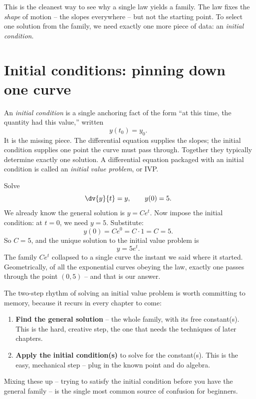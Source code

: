This is the cleanest way to see why a single law yields a family. The law fixes the \emph{shape} of motion -- the slopes everywhere -- but not the starting point. To select one solution from the family, we need exactly one more piece of data: an \emph{initial condition}.

\section{Initial conditions: pinning down one curve}
\label{ch36:sec-ic}

An \emph{initial condition} is a single anchoring fact of the form ``at this time, the quantity had this value,'' written
\[
  y(t_0) = y_0.
\]
It is the missing piece. The differential equation supplies the slopes; the initial condition supplies one point the curve must pass through. Together they typically determine exactly one solution. A differential equation packaged with an initial condition is called an \emph{initial value problem}, or IVP.

\begin{example}
\label{ch36:ex-ivp}
Solve
\[
  \dv{y}{t} = y, \qquad y(0) = 5.
\]
We already know the general solution is $y = Ce^t$. Now impose the initial condition: at $t=0$, we need $y = 5$. Substitute:
\[
  y(0) = Ce^{0} = C\cdot 1 = C = 5.
\]
So $C = 5$, and the unique solution to the initial value problem is
\[
  y = 5e^t.
\]
The family $Ce^t$ collapsed to a single curve the instant we said where it started. Geometrically, of all the exponential curves obeying the law, exactly one passes through the point $(0,5)$ -- and that is our answer.
\end{example}

\begin{focusbox}
The two-step rhythm of solving an initial value problem is worth committing to memory, because it recurs in every chapter to come:
\begin{enumerate}
  \item \textbf{Find the general solution} -- the whole family, with its free constant(s). This is the hard, creative step, the one that needs the techniques of later chapters.
  \item \textbf{Apply the initial condition(s)} to solve for the constant(s). This is the easy, mechanical step -- plug in the known point and do algebra.
\end{enumerate}
Mixing these up -- trying to satisfy the initial condition before you have the general family -- is the single most common source of confusion for beginners.
\end{focusbox}

